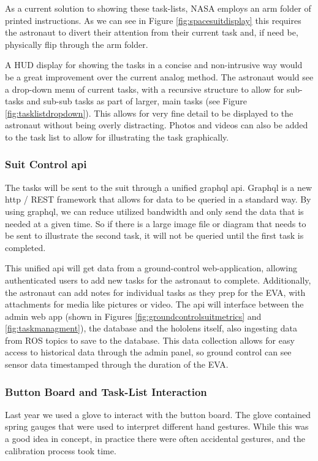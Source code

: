 \documentclass{article}
\let\Oldsubsubsection\subsubsection
\renewcommand{\subsubsection}{\FloatBarrier\Oldsubsubsection}
\begin{document}
As a current solution to showing these task-lists, NASA employs an arm folder of printed instructions. As we can see in Figure \ref{fig:spacesuitdisplay} this requires the astronaut to divert their attention from their current task and, if need be, physically flip through the arm folder.

A HUD display for showing the tasks in a concise and non-intrusive way would be a great improvement over the current analog method. The astronaut would see a drop-down menu of current tasks, with a recursive structure to allow for sub-tasks and sub-sub tasks as part of larger, main tasks (see Figure \ref{fig:tasklistdropdown}). This allows for very fine detail to be displayed to the astronaut without being overly distracting. Photos and videos can also be added to the task list to allow for illustrating the task graphically.

\subsubsection{Suit Control api}

The tasks will be sent to the suit through a unified graphql api. Graphql is a new http / REST framework that allows for data to be queried in a standard way. By using graphql, we can reduce utilized bandwidth and only send the data that is needed at a given time. So if there is a large image file or diagram that needs to be sent to illustrate the second task, it will not be queried until the first task is completed.

This unified api will get data from a ground-control web-application, allowing authenticated users to add new tasks for the astronaut to complete. Additionally, the astronaut can add notes for individual tasks as they prep for the EVA, with attachments for media like pictures or video. The api will interface between the admin web app (shown in Figures \ref{fig:groundcontrolsuitmetrics} and \ref{fig:taskmanagment}), the database and the hololens itself, also ingesting data from ROS topics to save to the database. This data collection allows for easy access to historical data through the admin panel, so ground control can see sensor data timestamped through the duration of the EVA.

\subsubsection{Button Board and Task-List Interaction}

Last year we used a glove to interact with the button board. The glove contained spring gauges that were used to interpret different hand gestures. While this was a good idea in concept, in practice there were often accidental gestures, and the calibration process took time.
\end{document}
